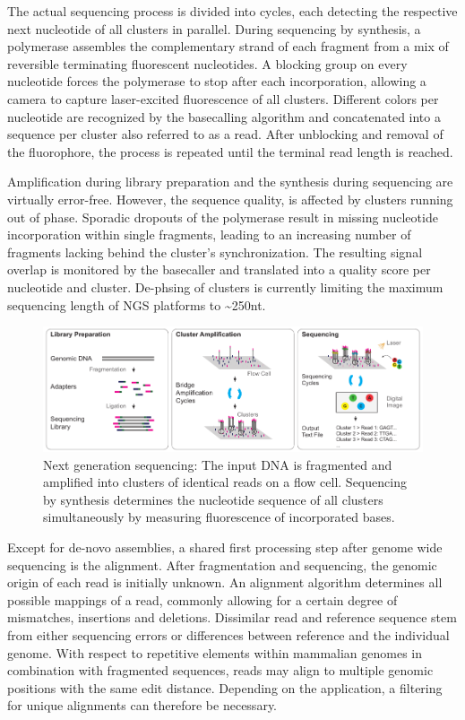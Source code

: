 The actual sequencing process is divided into cycles, each detecting the respective next nucleotide of all clusters in parallel.
During sequencing by synthesis, a polymerase assembles the complementary strand of each fragment from a mix of reversible terminating fluorescent nucleotides.
A blocking group on every nucleotide forces the polymerase to stop after each incorporation, allowing a camera to capture laser-excited fluorescence of all clusters.
Different colors per nucleotide are recognized by the basecalling algorithm and concatenated into a sequence per cluster also referred to as a read.
After unblocking and removal of the fluorophore, the process is repeated until the terminal read length is reached.

Amplification during library preparation and the synthesis during sequencing are virtually error-free.
However, the sequence quality, is affected by clusters running out of phase. 
Sporadic dropouts of the polymerase result in missing nucleotide incorporation within single fragments, leading to an increasing number of fragments lacking behind the cluster's synchronization.
The resulting signal overlap is monitored by the basecaller and translated into a quality score per nucleotide and cluster.
De-phsing of clusters is currently limiting the maximum sequencing length of NGS platforms to \textasciitilde250nt.

\begin{figure}[h]
	\centering
	\includegraphics[width=1.0\textwidth]{figures/intro/sbs.pdf}
	\captionsetup{format=plain}
	\caption[Sequencing by synthesis]{Next generation sequencing: The input DNA is fragmented and amplified into clusters of identical reads on a flow cell. Sequencing by synthesis determines the nucleotide sequence of all clusters simultaneously by measuring fluorescence of incorporated bases.}
	\label{fig:intro:sbs}
\end{figure}

Except for de-novo assemblies, a shared first processing step after genome wide sequencing is the alignment.
After fragmentation and sequencing, the genomic origin of each read is initially unknown.
An alignment algorithm determines all possible mappings of a read, commonly allowing for a certain degree of mismatches, insertions and deletions.
Dissimilar read and reference sequence stem from either sequencing errors or differences between reference and the individual genome.
With respect to repetitive elements within mammalian genomes in combination with fragmented sequences, reads may align to multiple genomic positions with the same edit distance.
Depending on the application, a filtering for unique alignments can therefore be necessary.

